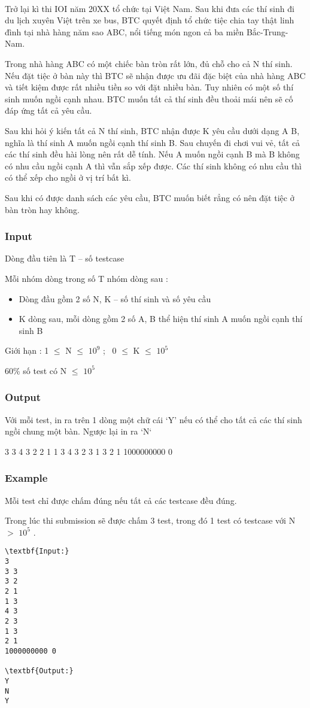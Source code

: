 

 

Trở lại kì thi IOI năm 20XX tổ chức tại Việt Nam. Sau khi đưa các thí sinh đi du lịch xuyên Việt trên xe bus, BTC quyết định tổ chức tiệc chia tay thật linh đình tại nhà hàng năm sao ABC, nổi tiếng món ngon cả ba miền Bắc-Trung-Nam.

Trong nhà hàng ABC có một chiếc bàn tròn rất lớn, đủ chỗ cho cả N thí sinh. Nếu đặt tiệc ở bàn này thì BTC sẽ nhận được ưu đãi đặc biệt của nhà hàng ABC và tiết kiệm được rất nhiều tiền so với đặt nhiều bàn. Tuy nhiên có một số thí sinh muốn ngồi cạnh nhau. BTC muốn tất cả thí sinh đều thoải mái nên sẽ cố đáp ứng tất cả yêu cầu.

Sau khi hỏi ý kiến tất cả N thí sinh, BTC nhận được K yêu cầu dưới dạng A B, nghĩa là thí sinh A muốn ngồi cạnh thí sinh B. Sau chuyến đi chơi vui vẻ, tất cả các thí sinh đều hài lòng nên rất dễ tính. Nếu A muốn ngồi cạnh B mà B không có nhu cầu ngồi cạnh A thì vẫn sắp xếp được. Các thí sinh không có nhu cầu thì có thể xếp cho ngồi ở vị trí bất kì.

Sau khi có được danh sách các yêu cầu, BTC muốn biết rẳng có nên đặt tiệc ở bàn tròn hay không.

\subsubsection{Input}

Dòng đầu tiên là T – số testcase


Mỗi nhóm dòng trong số T nhóm dòng sau :
\begin{itemize}
	\item Dòng đầu gồm 2 số N, K – số thí sinh và số yêu cầu
	\item K dòng sau, mỗi dòng gồm 2 số A, B thể hiện thí sinh A muốn ngồi cạnh thí sinh B
\end{itemize}

Giới hạn : 1  $\le$  N  $\le$  $10^{9}$ ;  0  $\le$  K  $\le$  $10^{5}$


60\% số test có N  $\le$  $10^{5}$

\subsubsection{Output}

Với mỗi test, in ra trên 1 dòng một chữ cái ‘Y’ nếu có thể cho tất cả các thí sinh ngồi chung một bàn. Ngược lại in ra ‘N‘

3 3 4 3 2 2 1 1 3 4 3 2 3 1 3 2 1 1000000000 0

\subsubsection{Example}

Mỗi test chỉ được chấm đúng nếu tất cả các testcase đều đúng.

Trong lúc thi submission sẽ được chấm 3 test, trong đó 1 test có testcase với N $>$ $10^{5}$ .
\begin{verbatim}
\textbf{Input:}
3
3 3
3 2
2 1
1 3
4 3
2 3
1 3
2 1
1000000000 0

\textbf{Output:}
Y
N
Y\end{verbatim}

